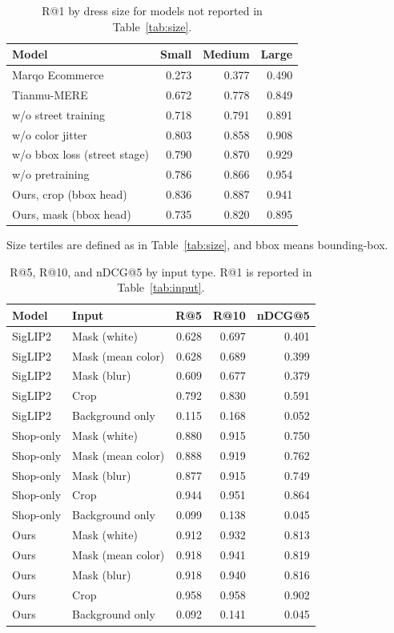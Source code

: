 \documentclass[sigconf,nonacm]{acmart}
\begin{document}
\begin{table}[ht]
  \caption{R@1 by dress size for models not reported in Table~\ref{tab:size}.}
  \label{tab:d2}
  \small
  \begin{tabular}{lrrr}
    \toprule
    Model & Small & Medium & Large \\
    \midrule
    Marqo Ecommerce & 0.273 & 0.377 & 0.490 \\
    Tianmu-MERE & 0.672 & 0.778 & 0.849 \\
    w/o street training & 0.718 & 0.791 & 0.891 \\
    w/o color jitter & 0.803 & 0.858 & 0.908 \\
    w/o bbox loss (street stage) & 0.790 & 0.870 & 0.929 \\
    w/o pretraining & 0.786 & 0.866 & 0.954 \\
    Ours, crop (bbox head) & 0.836 & 0.887 & 0.941 \\
    Ours, mask (bbox head) & 0.735 & 0.820 & 0.895 \\
    \bottomrule
  \end{tabular}
  \par\smallskip
  \footnotesize Size tertiles are defined as in Table~\ref{tab:size}, and bbox means bounding-box.
\end{table}

\begin{table}[ht]
  \caption{R@5, R@10, and nDCG@5 by input type. R@1 is reported in Table~\ref{tab:input}.}
  \label{tab:d3}
  \small
  \begin{tabular}{llrrr}
    \toprule
    Model & Input & R@5 & R@10 & nDCG@5 \\
    \midrule
    SigLIP2 & Mask (white) & 0.628 & 0.697 & 0.401 \\
    SigLIP2 & Mask (mean color) & 0.628 & 0.689 & 0.399 \\
    SigLIP2 & Mask (blur) & 0.609 & 0.677 & 0.379 \\
    SigLIP2 & Crop & 0.792 & 0.830 & 0.591 \\
    SigLIP2 & Background only & 0.115 & 0.168 & 0.052 \\
    Shop-only & Mask (white) & 0.880 & 0.915 & 0.750 \\
    Shop-only & Mask (mean color) & 0.888 & 0.919 & 0.762 \\
    Shop-only & Mask (blur) & 0.877 & 0.915 & 0.749 \\
    Shop-only & Crop & 0.944 & 0.951 & 0.864 \\
    Shop-only & Background only & 0.099 & 0.138 & 0.045 \\
    Ours & Mask (white) & 0.912 & 0.932 & 0.813 \\
    Ours & Mask (mean color) & 0.918 & 0.941 & 0.819 \\
    Ours & Mask (blur) & 0.918 & 0.940 & 0.816 \\
    Ours & Crop & 0.958 & 0.958 & 0.902 \\
    Ours & Background only & 0.092 & 0.141 & 0.045 \\
    \bottomrule
  \end{tabular}
\end{table}
\end{document}
